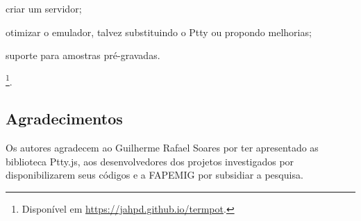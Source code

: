 \begin{inparaenum}
\item criar um servidor;
\item otimizar o emulador, talvez substituindo o Ptty ou propondo melhorias;
\item suporte para amostras pré-gravadas.
\end{inparaenum}

\footnote{Disponível em  \url{https://jahpd.github.io/termpot}.}. 

\subsection{Agradecimentos}

Os autores agradecem ao Guilherme Rafael Soares por ter apresentado as biblioteca Ptty.js, aos desenvolvedores dos projetos investigados por disponibilizarem seus códigos e a FAPEMIG por subsidiar a pesquisa.
